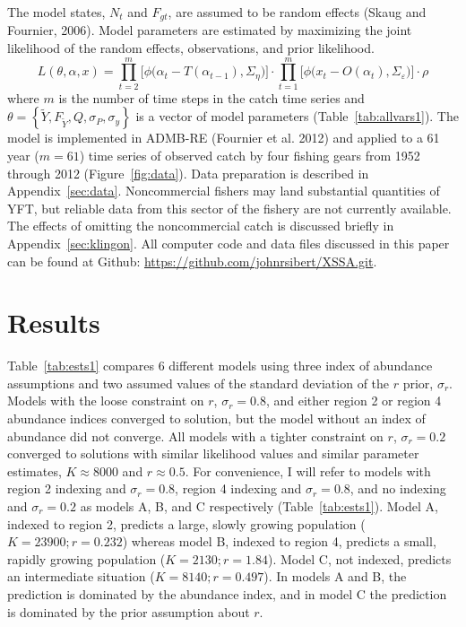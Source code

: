 \documentclass[12pt,letterpaper]{article}
\newcommand\MSY{\widetilde{Y}}
\newcommand\Fmsy{F_{\MSY}}
\begin{document}
The model states, $N_t$ and $F_{gt}$, are assumed to be random
effects (Skaug and Fournier, 2006). Model parameters are estimated by
maximizing the joint likelihood of the random
effects, observations, and prior likelihood.
\begin{equation}
\label{eqn:likelihood}
L(\theta,\alpha,x)=
\prod^m_{t=2}\big[\phi\big(\alpha_t-T(\alpha_{t-1}), \Sigma_\eta\big)\big]\cdot
\prod^m_{t=1}\big[\phi\big(x_t-O(\alpha_t),
\Sigma_\varepsilon\big)\big]\cdot\rho
\end{equation}
where $m$ is the number of time steps in the catch time series and
$\theta=\left\{\MSY,\Fmsy,Q,\sigma_P,\sigma_y\right\}$ 
is a vector of model parameters (Table~\ref{tab:allvars1}).
The model is implemented in ADMB-RE (Fournier et al. 2012) and
applied to a 61 year ($m=61$) time series of observed
catch by four fishing gears from 1952 through 2012
(Figure~\ref{fig:data}).
Data preparation is described in Appendix~\ref{sec:data}.
Noncommercial fishers may land substantial quantities of YFT, but
reliable data from this sector of the fishery are not currently
available. The effects of omitting the noncommercial catch is
discussed briefly in Appendix~\ref{sec:klingon}.
All computer code and data files discussed in this
paper can be found at Github:
\url{https://github.com/johnrsibert/XSSA.git}.

\section*{Results}
Table~\ref{tab:ests1} compares 6 different models
using three index of abundance assumptions and two 
assumed values of the standard deviation of the $r$ prior, $\sigma_r$. 
Models with the loose constraint on $r$, $\sigma_r=0.8$, and either
region 2 or region 4 abundance indices converged to solution, but the
model without an index of abundance did not converge.
All models with a tighter constraint on $r$, $\sigma_r=0.2$ converged
to solutions with similar likelihood values and similar
parameter estimates, $K\approx 8000$ and $r\approx 0.5$.
For convenience, I will refer to models with 
region 2 indexing and $\sigma_r=0.8$,
region 4 indexing and $\sigma_r=0.8$, and 
no indexing and $\sigma_r=0.2$
as models A, B, and C respectively (Table~\ref{tab:ests1}).
Model A, indexed to region 2, 
predicts a large, slowly growing population ($K=23900; r=0.232$)
whereas model B, indexed to region 4, predicts a small, rapidly growing
population ($K = 2130; r=1.84$).
Model C, not indexed, predicts an intermediate situation ($K=8140; r=0.497$). 
In models A and B, the prediction is dominated by
the abundance index, and in model C the prediction is dominated by the
prior assumption about $r$.
\end{document}
